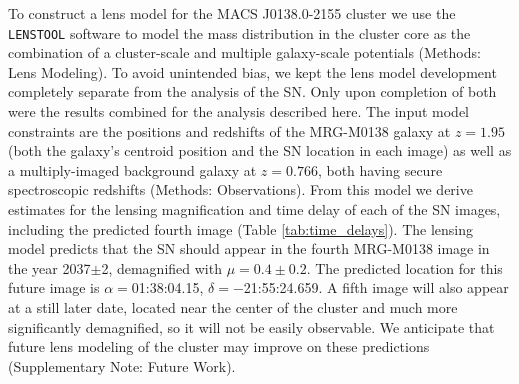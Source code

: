 \documentclass[12pt]{article}
\def\lenstool{{\tt LENSTOOL}\xspace}
\begin{document}
To construct a lens model for the MACS J0138.0-2155 cluster we use the \lenstool software \cite{jullo_bayesian_2007,kneib_lenstool_2011} to model the mass distribution in the cluster core as the combination of a cluster-scale and multiple galaxy-scale potentials 
(Methods: Lens Modeling).
To avoid unintended bias, we kept the lens model development completely separate from the analysis of the SN.  Only upon  completion of both were the results combined for the analysis described here.  The input model constraints are the positions and redshifts of the MRG-M0138 galaxy at $z=1.95$ (both the galaxy's centroid position and the SN location in each image) as well as a multiply-imaged background 
galaxy at $z=0.766$, both having secure spectroscopic redshifts
(Methods: Observations).
From this model we derive estimates for the lensing magnification and time delay of each of the SN images, including the predicted fourth image (Table \ref{tab:time_delays}).
The lensing model predicts that the SN should appear in the fourth MRG-M0138 image in the year 2037$\pm$2, demagnified with $\mu=0.4\pm0.2$. The predicted location for this future image is $\alpha=$01:38:04.15, $\delta=-$21:55:24.659.
A fifth image will also appear at a still later date, located near the center of the cluster and much more significantly demagnified, so it will not be easily observable.  We anticipate that future lens modeling of the cluster may improve on these predictions (Supplementary Note: Future Work). 
 
\end{document}
